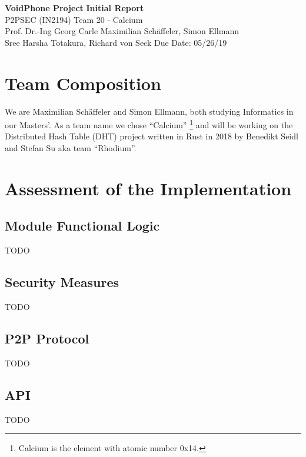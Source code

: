 \documentclass[a4paper, 11pt]{article}
\begin{document}
\noindent
\large\textbf{VoidPhone Project} \hfill \textbf{Initial Report} \\
\normalsize P2PSEC (IN2194)  \hfill Team 20 - Calcium\\
Prof. Dr.-Ing Georg Carle \hfill Maximilian Schäffeler, Simon Ellmann \\
Sree Harsha Totakura, Richard von Seck \hfill Due Date: 05/26/19

%

\section*{Team Composition}
We are Maximilian Schäffeler and Simon Ellmann, both studying Informatics in our Masters'. As a team name we chose ``Calcium'' \footnote{Calcium is the element with atomic number 0x14.} and will be working on the Distributed Hash Table (DHT) project written in Rust in 2018 by Benedikt Seidl and Stefan Su aka team ``Rhodium''.


\section*{Assessment of the Implementation}
\subsection{Module Functional Logic}
TODO

\subsection{Security Measures}
TODO

\subsection{P2P Protocol}
TODO

\subsection{API}
TODO
\end{document}
